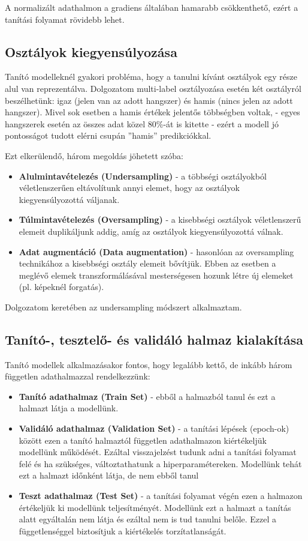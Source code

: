 A normalizált adathalmon a gradiens általában hamarabb csökkenthető, ezért a tanítási folyamat rövidebb lehet. \cite{LeCun2012}

\subsection{Osztályok kiegyensúlyozása}

Tanító modelleknél gyakori probléma, hogy a tanulni kívánt osztályok egy része alul van reprezentálva. Dolgozatom multi-label osztályozása esetén két osztályról beszélhetünk: igaz (jelen van az adott hangszer) és hamis (nincs jelen az adott hangszer). Mivel sok esetben a hamis értékek jelentős többségben voltak, - egyes hangszerek esetén az összes adat közel 80\%-át is kitette - ezért a modell jó pontosságot tudott elérni csupán ''hamis'' predikciókkal.

Ezt elkerülendő, három megoldás jöhetett szóba:
\begin{itemize}
 \item \textbf{Alulmintavételezés (Undersampling)} - a többségi osztályokból véletlenszerűen eltávolítunk annyi elemet, hogy az osztályok kiegyensúlyozottá váljanak.
 \item \textbf{Túlmintavételezés (Oversampling)} - a kisebbségi osztályok véletlenszerű elemeit duplikáljunk addig, amíg az osztályok kiegyensúlyozottá válnak.
 \item \textbf{Adat augmentáció (Data augmentation)} - hasonlóan az oversampling technikához a kisebbségi osztály elemeit bővítjük. Ebben az esetben a meglévő elemek transzformálásával mesterségesen hozunk létre új elemeket (pl. képeknél forgatás). \cite{imbalanced}
\end{itemize}

Dolgozatom keretében az undersampling módszert alkalmaztam.

\subsection{Tanító-, tesztelő- és validáló halmaz kialakítása}

Tanító modellek alkalmazásakor fontos, hogy legalább kettő, de inkább három független adathalmazzal rendelkezzünk: 
\begin{itemize}
 \item \textbf{Tanító adathalmaz (Train Set)} - ebből a halmazból tanul és ezt a halmazt látja a modellünk.
 \item \textbf{Validáló adathalmaz (Validation Set)} - a tanítási lépések (epoch-ok) között ezen a tanító halmaztól független adathalmazon kiértékeljük modellünk működését. Ezáltal visszajelzést tudunk adni a tanítási folyamat felé és ha szükséges, változtathatunk a hiperparamétereken. Modellünk tehát ezt a halmazt időnként látja, de nem ebből tanul
 \item \textbf{Teszt adathalmaz (Test Set)} - a tanítási folyamat végén ezen a halmazon értékeljük ki modellünk teljesítményét. Modellünk ezt a halmazt a tanítás alatt egyáltalán nem látja és ezáltal nem is tud tanulni belőle. Ezzel a függetlenséggel biztosítjuk a kiértékelés torzítatlanságát. \cite{traintestvalid}
\end{itemize}

